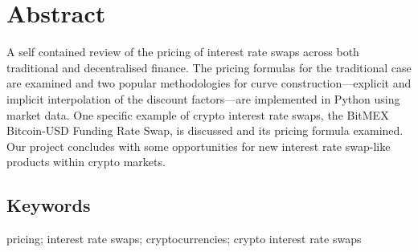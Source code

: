 
\section*{\hspace{0.05\textwidth}Abstract}
\vspace{0.5cm}

\begin{center}
\begin{minipage}{0.9\textwidth}
A self contained review of the pricing of interest rate swaps across both traditional and decentralised finance. The pricing formulas for the traditional case are examined and two popular methodologies for curve construction––explicit and implicit interpolation of the discount factors––are implemented in Python using market data. One specific example of crypto interest rate swaps, the BitMEX Bitcoin-USD Funding Rate Swap, is discussed and its pricing formula examined. Our project concludes with some opportunities for new interest rate swap-like products within crypto markets. 
\end{minipage}
\end{center}

\vspace{1cm}

\subsection*{\hspace{0.05\textwidth}Keywords}
\hspace{0.05\textwidth}pricing; interest rate swaps; cryptocurrencies; crypto interest rate swaps
